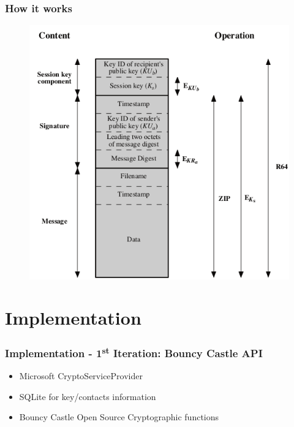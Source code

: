 \documentclass{beamer}
\begin{document}
\begin{frame}
\frametitle{How it works}

\begin{figure}
\includegraphics[scale=0.4]{PgpMsgFormat}
\end{figure}

\end{frame}

\section{Implementation}

\begin{frame}
\frametitle{Implementation - 1\textsuperscript{st} Iteration: Bouncy Castle API}

\begin{itemize}
\item Microsoft CryptoServiceProvider
\item SQLite for key/contacts information
\item Bouncy Castle Open Source Cryptographic functions
\end{itemize}

\end{frame}
\end{document}
